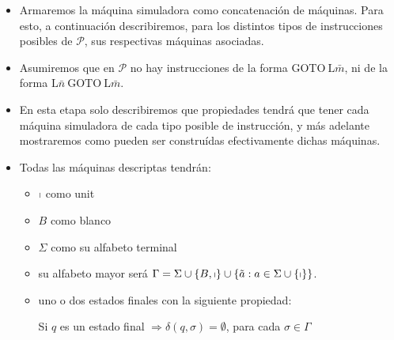 \begin{frame}
	\begin{itemize}
		\item Armaremos la máquina simuladora como concatenación de máquinas. Para esto, a continuación describiremos, para
		los distintos tipos de instrucciones posibles de $\mathcal{P}$, sus respectivas máquinas asociadas.

		\item Asumiremos que en $\mathcal{P}$ no hay instrucciones de la forma $\mathrm{GOTO} \ \mathrm{L}\bar{m}$, ni de la
		forma $\mathrm{L}\bar{n} \ \mathrm{GOTO} \ \mathrm{L}\bar{m}$.

		\item En esta etapa solo describiremos que propiedades tendrá que tener cada máquina simuladora de cada tipo posible
		de instrucción, y más adelante mostraremos como pueden ser construídas efectivamente dichas máquinas.

		\item Todas las máquinas descriptas tendrán:
		 	\begin{itemize}
				\item $\shortmid$ como unit
				\item $B$ como blanco
				\item $\Sigma$ como su alfabeto terminal
				\item su alfabeto mayor será $\Gamma = \Sigma \cup \{B,\shortmid\} \cup \{\tilde{a}: a \in \Sigma \cup
					\{\shortmid\}\}$.
				\item uno o dos estados finales con la siguiente propiedad:
					\vspace{3mm}
					\begin{center}
						Si $q$ es un estado final $\Rightarrow \delta(q,\sigma) = \emptyset$, para cada $\sigma \in \Gamma$
					\end{center}
			\end{itemize}
	\end{itemize}
\end{frame}
